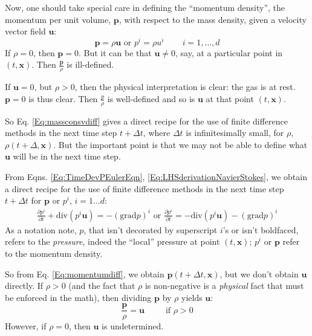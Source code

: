 \documentclass[10pt]{amsart}
\begin{document}
\begin{multicols*}{2}
Now, one should take special care in defining the ``momentum density'', the momentum per unit volume, $\mathbf{p}$,  with respect to the mass density, given a velocity vector field $\mathbf{u}$:
\begin{equation}
\mathbf{p} = \rho \mathbf{u}  \text{ or } p^i = \rho u^i \qquad \, i = 1, \dots , d
  \end{equation}
If $\rho =0$, then $\mathbf{p}=0$.  But it can be that $\mathbf{u} \neq 0$, say, at a particular point in $(t,\mathbf{x})$.  Then $\frac{\mathbf{p}}{\rho}$ is ill-defined.

If $\mathbf{u}=0$, but $\rho >0$, then the physical interpretation is clear: the gas is at rest.  $\mathbf{p}=0$ is thus clear.  Then $\frac{p}{\rho}$ is well-defined and so is $\mathbf{u}$ at that point $(t,\mathbf{x})$.

So Eq. \ref{Eq:massconsvdiff} gives a direct recipe for the use of finite difference methods in the next time step $t+\Delta t$, where $\Delta t$ is infinitesimally small, for $\rho$, $\rho(t+\Delta,\mathbf{x})$.  But the important point is that we may not be able to define what $\mathbf{u}$ will be in the next time step.

From Eqns. \ref{Eq:TimeDevPEulerEqn}, \ref{Eq:LHSderivationNavierStokes}, we obtain a direct recipe for the use of finite difference methods in the next time step $t+\Delta t$ for $\mathbf{p}$ or $p^i$, $i=1\dots d$:
\begin{equation}\label{Eq:momentumdiff}
\begin{gathered}
  \frac{ \partial p^i }{ \partial t} + \text{div}(p^i \mathbf{u}) = -(\text{grad}p)^i \text{ or } \frac{ \partial p^i}{ \partial t} = - \text{div}(p^i \mathbf{u}) - (\text{grad}p)^i
  \end{gathered}
  \end{equation}
As a notation note, $p$, that isn't decorated by superscript $i$'s or isn't boldfaced, refers to the \emph{pressure}, indeed the ``local'' pressure at point $(t,\mathbf{x})$; $p^i$ or $\mathbf{p}$ refer to the momentum density.

So from Eq. \ref{Eq:momentumdiff}, we obtain $\mathbf{p}(t+\Delta t, \mathbf{x})$, but we don't obtain $\mathbf{u}$ directly.  If $\rho >0$ (and the fact that $\rho$ is non-negative is a \emph{physical} fact that must be enforced in the math), then dividing $\mathbf{p}$ by $\rho$ yields $\mathbf{u}$:
\begin{equation}\label{Eq:fromprhoobtainu}
\frac{\mathbf{p}}{\rho} = \mathbf{u} \qquad \, \text{ if } \rho >0
\end{equation}
However, if $\rho =0$, then $\mathbf{u}$ is undetermined.  


\end{multicols*}
\end{document}
